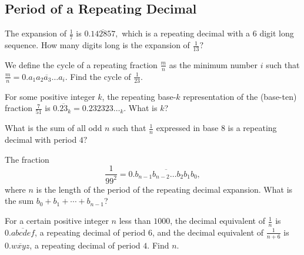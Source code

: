 \documentclass{article}
\begin{document}
\subsection{Period of a Repeating Decimal}
\begin{prob}[]{2}
The expansion of $\frac{1}{7}$ is $0.\overline{142857},$ which is a repeating decimal with a $6$ digit long sequence. How many digits long is the expansion of $\frac{1}{13}?$
\end{prob}

\begin{prob}[]{3}
We define the cycle of a repeating fraction $\tfrac{m}{n}$ as the minimum number $i$ such that $\tfrac{m}{n} = 0.\overline{a_1a_2a_3\dots a_i}$. Find the cycle of $\tfrac{1}{23}$.
\end{prob}

\begin{prob}[AMC 10A 2019/18]{3}
For some positive integer $k$, the repeating base-$k$ representation of the (base-ten) fraction $\frac{7}{51}$ is $0.\overline{23}_k = 0.232323\ldots_k$. What is $k$?
\end{prob}

\begin{req}{4}
What is the sum of all odd $n$ such that $\frac{1}{n}$ expressed in base $8$ is a repeating decimal with period $4?$
\end{req}

\begin{prob}[AMC 12A 2014/23]{6}
The fraction\[\dfrac1{99^2}=0.\overline{b_{n-1}b_{n-2}\ldots b_2b_1b_0},\]where $n$ is the length of the period of the repeating decimal expansion. What is the sum $b_0+b_1+\cdots+b_{n-1}$?
\end{prob}

\begin{prob}[AMC 12B 2016/22]{6}
For a certain positive integer $n$ less than $1000$, the decimal equivalent of $\frac{1}{n}$ is $0.\overline{abcdef}$, a repeating decimal of period $6$, and the decimal equivalent of $\frac{1}{n+6}$ is $0.\overline{wxyz}$, a repeating decimal of period $4$. Find $n.$
\end{prob}
\end{document}
